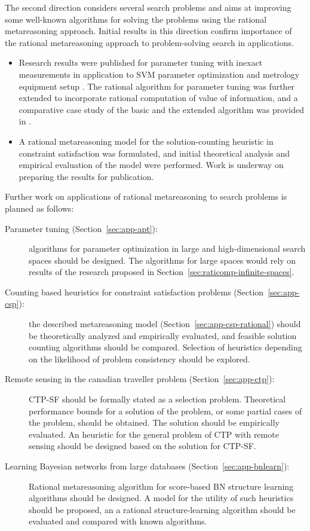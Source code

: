 The second direction considers several search problems and aims at
improving some well-known algorithms for solving the problems
using the rational metareasoning approach. Initial results in this
direction confirm importance of the rational metareasoning approach to
problem-solving search in applications.
 \begin{itemize}
\item Research results were published for parameter tuning with
inexact measurements in application to SVM parameter optimization and
metrology equipment setup \cite{TolpinShimony.blinkered}. The rational
algorithm for parameter tuning was further extended to incorporate
rational computation of value of information, and a comparative case
study of the basic and the extended algorithm was provided in
\cite{TolpinShimony.raticomp}.
\item A rational metareasoning model for the solution-counting
heuristic in constraint satisfaction was formulated, and initial
theoretical analysis and empirical evaluation of the model were
performed. Work is underway on preparing the results for publication.
\end{itemize}
Further work on applications of rational metareasoning to search
problems is planned as follows:
\begin{description}
\item[Parameter tuning (Section~\ref{sec:app-apt}):] algorithms for
  parameter optimization in large and high-dimensional search spaces
  should be designed. The algorithms for large spaces
  would rely on results of the research proposed in
  Section~\ref{sec:raticomp-infinite-spaces}.
\item[Counting based heuristics for constraint satisfaction problems
  (Section~\ref{sec:app-csp}):] the described metareasoning model
  (Section~\ref{sec:app-csp-rational}) should be theoretically analyzed
  and empirically evaluated, and feasible solution counting algorithms
  should be compared. Selection of heuristics depending on the
  likelihood of problem consistency should be explored.
\item[Remote sensing in the canadian traveller problem
  (Section~\ref{sec:app-ctp}):] CTP-SF should be formally
  stated as a selection problem. Theoretical performance bounds
  for a solution of the problem, or some partial cases of the problem, should be
  obtained. The solution should be empirically evaluated. An heuristic
  for the general problem of CTP with remote sensing should be designed
  based on the solution for CTP-SF.
\item[Learning Bayesian networks from large databases
  (Section~\ref{sec:app-bnlearn}):] Rational metareasoning algorithm for
  score-based BN structure learning algorithms should be designed. A model for
  the utility of such heuristics should be proposed, an a rational
  structure-learning algorithm should be evaluated and compared with
  known algorithms.
\end{description}

